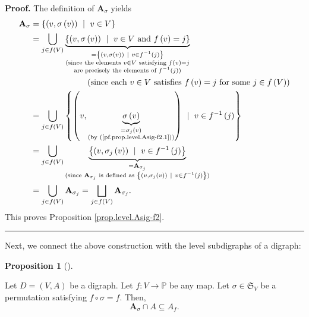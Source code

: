 \documentclass[numbers=enddot,12pt,final,onecolumn,notitlepage]{scrartcl}%
\numberwithin{exer}{section}
\theoremstyle{definition}
\newtheorem{prop}[theo]{Proposition}
\newenvironment{proposition}[1][]
{\begin{prop}[#1]\begin{leftbar}}
{\end{leftbar}\end{prop}}
\newenvironment{proof}[1][Proof]{\noindent\textbf{#1.} }{\ \rule{0.5em}{0.5em}}
\let\cupnonlimits\bigcup
\let\sqcupnonlimits\bigsqcup
\renewcommand{\bigcup}{\cupnonlimits\limits}
\renewcommand{\bigsqcup}{\sqcupnonlimits\limits}
\newenvironment{verlong}{}{}
\begin{document}
\begin{verlong}
\begin{proof}
The definition of $\mathbf{A}_{\sigma}$ yields%
\begin{align*}
\mathbf{A}_{\sigma}  &  =\left\{  \left(  v,\sigma\left(  v\right)  \right)
\ \mid\ v\in V\right\} \\
&  =\bigcup_{j\in f\left(  V\right)  }\underbrace{\left\{  \left(
v,\sigma\left(  v\right)  \right)  \ \mid\ v\in V\text{ and }f\left(
v\right)  =j\right\}  }_{\substack{=\left\{  \left(  v,\sigma\left(  v\right)
\right)  \ \mid\ v\in f^{-1}\left(  j\right)  \right\}  \\\text{(since the
elements }v\in V\text{ satisfying }f\left(  v\right)  =j\\\text{are precisely
the elements of }f^{-1}\left(  j\right)  \text{)}}}\\
&  \ \ \ \ \ \ \ \ \ \ \ \ \ \ \ \ \ \ \ \ \left(  \text{since each }v\in
V\text{ satisfies }f\left(  v\right)  =j\text{ for some }j\in f\left(
V\right)  \right) \\
&  =\bigcup_{j\in f\left(  V\right)  }\left\{  \left(  v,\underbrace{\sigma
\left(  v\right)  }_{\substack{=\sigma_{j}\left(  v\right)  \\\text{(by
(\ref{pf.prop.level.Asig-f2.1}))}}}\right)  \ \mid\ v\in f^{-1}\left(
j\right)  \right\} \\
&  =\bigcup_{j\in f\left(  V\right)  }\underbrace{\left\{  \left(
v,\sigma_{j}\left(  v\right)  \right)  \ \mid\ v\in f^{-1}\left(  j\right)
\right\}  }_{\substack{=\mathbf{A}_{\sigma_{j}}\\\text{(since }\mathbf{A}%
_{\sigma_{j}}\text{ is defined as }\left\{  \left(  v,\sigma_{j}\left(
v\right)  \right)  \ \mid\ v\in f^{-1}\left(  j\right)  \right\}  \text{)}}}\\
&  =\bigcup_{j\in f\left(  V\right)  }\mathbf{A}_{\sigma_{j}}=\bigsqcup_{j\in
f\left(  V\right)  }\mathbf{A}_{\sigma_{j}}.
\end{align*}
This proves Proposition \ref{prop.level.Asig-f2}.
\end{proof}
\end{verlong}

Next, we connect the above construction with the level subdigraphs of a digraph:

\begin{proposition}
\label{prop.level.Asig-f}Let $D=\left(  V,A\right)  $ be a digraph. Let
$f:V\rightarrow\mathbb{P}$ be any map. Let $\sigma\in\mathfrak{S}_{V}$ be a
permutation satisfying $f\circ\sigma=f$. Then,
\[
\mathbf{A}_{\sigma}\cap A\subseteq A_{f}.
\]

\end{proposition}
\end{document}
